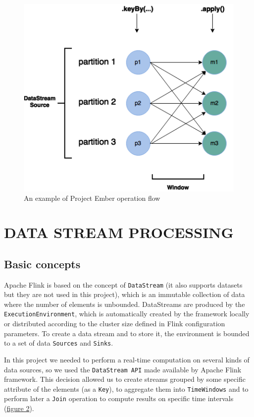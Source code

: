 \begin{figure}
\begin{center}
	\includegraphics[scale=0.40]{img/ember_keyedstream}
	\caption{An example of Project Ember operation flow}
	\label{fig:ember_operation_flow}
\end{center}
\end{figure}


\section{DATA STREAM PROCESSING}

\subsection{Basic concepts}
Apache Flink is based on the concept of \texttt{DataStream} (it also supports datasets but they are not used in this project), which is an immutable collection of data where the number of elements is unbounded. 
DataStreams are produced by the \texttt{ExecutionEnvironment}, which is automatically created by the framework locally or distributed according to the cluster size defined in Flink configuration parameters. To create a data stream and to store it, the environment is bounded to a set of data \texttt{Sources} and \texttt{Sinks}.

In this project we needed to perform a real-time computation on several kinds of data sources, so we used the \texttt{DataStream API} made available by Apache Flink framework. This decision allowed us to create streams grouped by some specific attribute of the elements (as a \texttt{Key}), to aggregate them into \texttt{TimeWindows} and to perform later a \texttt{Join} operation to compute results on specific time intervals (\hyperref[fig:ember_keyedstream]{figure 2}).

